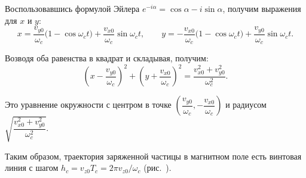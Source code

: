 Воспользовавшись формулой Эйлера \( e^{-i\alpha} = \cos\alpha - i\sin\alpha \),
получим выражения для \( x \) и \( y \):
\[
  x = \frac{v_{y0}}{\omega_c} \Big( 1 - \cos\omega_c t \Big) +
    \frac{v_{x0}}{\omega_c}\sin\omega_c t, \qquad
  y = -\frac{v_{x0}}{\omega_c} \Big( 1 - \cos\omega_c t \Big) +
    \frac{v_{y0}}{\omega_c}\sin\omega_c t.
\]

Возводя оба равенства в квадрат и складывая, получим:
\[
  \left( x - \frac{v_{y0}}{\omega_c} \right)^2 +
    \left( y + \frac{v_{x0}}{\omega_c} \right)^2 =
    \frac{v_{x0}^2 + v_{y0}^2}{\omega_c^2}.
\]

Это уравнение окружности с центром в точке
\(
  \left(
    \dfrac{v_{y0}}{\omega_c}, -\dfrac{v_{x0}}{\omega_c}
  \right)
\)
и радиусом \( \sqrt{\dfrac{v_{x0}^2 + v_{y0}^2}{\omega_c^2}} \).

Таким образом, траектория заряженной частицы в магнитном поле есть винтовая
линия с шагом \( h_c = v_{z0}T_c = 2\pi v_{z0} / \omega_c \) (рис.~).
